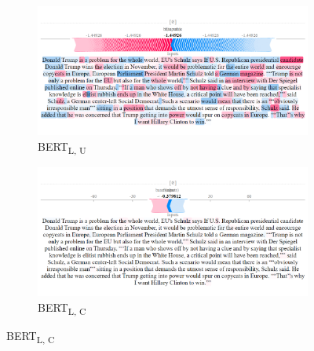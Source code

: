 \begin{figure}[!h]
    \begin{subfigure}[t]{0.35\textwidth}
        \includegraphics[width=\textwidth]{figs/news_T/bert-l-u.png}
        \caption{{BERT}\textsubscript{L, U}}
    \end{subfigure}
    \hspace{\fill} %
    \begin{subfigure}[t]{0.35\textwidth}
        \includegraphics[width=\linewidth]{figs/news_T/bert-l-c.png}
        \caption{{BERT}\textsubscript{L, C}}
    \end{subfigure}




\end{figure}
